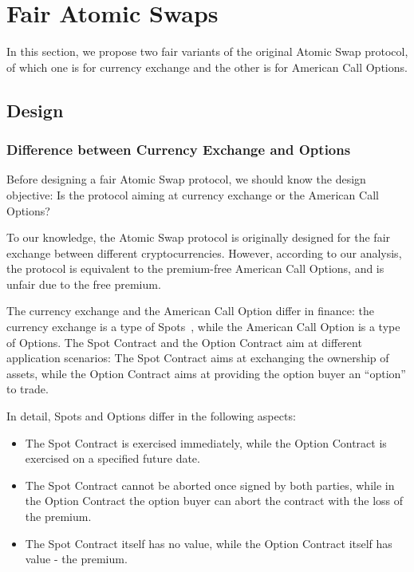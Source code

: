 \section{Fair Atomic Swaps}
\label{sec:fair_atomic_swap}

In this section, we propose two fair variants of the original Atomic Swap protocol, of which one is for currency exchange and the other is for American Call Options.

\subsection{Design}

\subsubsection{Difference between Currency Exchange and Options}

Before designing a fair Atomic Swap protocol, we should know the design objective:
Is the protocol aiming at currency exchange or the American Call Options?

To our knowledge, the Atomic Swap protocol is originally designed for the fair exchange between different cryptocurrencies.
However, according to our analysis, the protocol is equivalent to the premium-free American Call Options, and is unfair due to the free premium.

The currency exchange and the American Call Option differ in finance: the currency exchange is a type of Spots~\cite{hull1991introduction}, while the American Call Option is a type of Options.
The Spot Contract and the Option Contract aim at different application scenarios: The Spot Contract aims at exchanging the ownership of assets, while the Option Contract aims at providing the option buyer an ``option'' to trade.

In detail, Spots and Options differ in the following aspects:

\begin{itemize}
    \item The Spot Contract is exercised immediately, while the Option Contract is exercised on a specified future date.
    \item The Spot Contract cannot be aborted once signed by both parties, while in the Option Contract the option buyer can abort the contract with the loss of the premium.
    \item The Spot Contract itself has no value, while the Option Contract itself has value - the premium.
\end{itemize}

